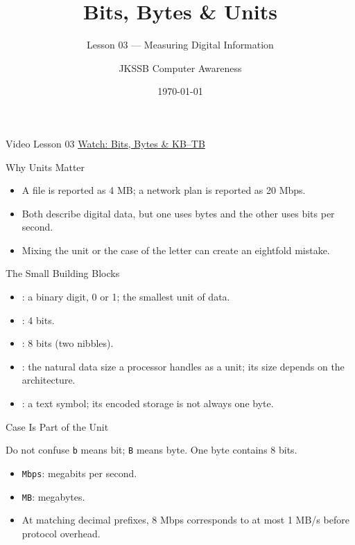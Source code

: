 \documentclass[aspectratio=169]{beamer}
\title{Bits, Bytes \& Units}
\subtitle{Lesson 03 --- Measuring Digital Information}
\author{JKSSB Computer Awareness}
\date{\today}
\begin{document}
\frame{\titlepage}

\begin{frame}{Video Lesson 03}
  \centering
  \Large\href{https://youtu.be/j_62CGCBElo}{Watch: Bits, Bytes \& KB--TB}
\end{frame}

\begin{frame}{Why Units Matter}
  \begin{itemize}
    \item A file is reported as 4 MB; a network plan is reported as 20 Mbps.
    \item Both describe digital data, but one uses bytes and the other uses
      bits per second.
    \item Mixing the unit or the case of the letter can create an eightfold
      mistake.
  \end{itemize}
\end{frame}

\begin{frame}{The Small Building Blocks}
  \begin{itemize}
    \item {}: a binary digit, 0 or 1; the smallest unit of data.
    \item {}: 4 bits.
    \item {}: 8 bits (two nibbles).
    \item {}: the natural data size a processor handles as a unit;
      its size depends on the architecture.
    \item {}: a text symbol; its encoded storage is not always
      one byte.
  \end{itemize}
\end{frame}

\begin{frame}{Case Is Part of the Unit}
  \begin{block}{Do not confuse}
    \texttt{b} means bit; \texttt{B} means byte. One byte contains 8 bits.
  \end{block}
  \begin{itemize}
    \item \texttt{Mbps}: megabits per second.
    \item \texttt{MB}: megabytes.
    \item At matching decimal prefixes, 8 Mbps corresponds to at most
      1 MB/s before protocol overhead.
  \end{itemize}
\end{frame}
\end{document}
